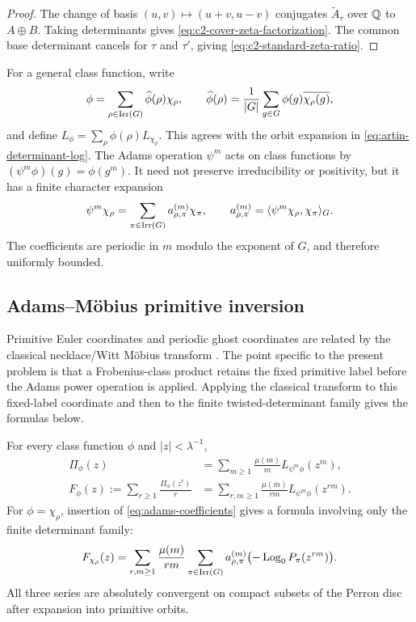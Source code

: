 \begin{proof}
The change of basis
\((u,v)\mapsto(u+v,u-v)\) conjugates \(\widetilde A_\tau\) over \(\mathbb{Q}\) to
\(A\oplus B\).  Taking determinants gives
\eqref{eq:c2-cover-zeta-factorization}.  The common base determinant cancels
for \(\tau\) and \(\tau'\), giving \eqref{eq:c2-standard-zeta-ratio}.
\end{proof}

For a general class function, write
\[
  \phi=\sum_{\rho\in\operatorname{Irr}(G)}
     \widehat\phi(\rho)\chi_\rho,
  \qquad
  \widehat\phi(\rho)
    =\frac1{|G|}\sum_{g\in G}\phi(g)\overline{\chi_\rho(g)},
\]
and define \(L_\phi=\sum_\rho\widehat\phi(\rho)L_{\chi_\rho}\).  This agrees
with the orbit expansion in \eqref{eq:artin-determinant-log}.  The Adams
operation \(\psi^m\) acts on class functions by
\((\psi^m\phi)(g)=\phi(g^m)\).  It need not preserve irreducibility or
positivity, but it has a finite character expansion
\begin{equation}\label{eq:adams-coefficients}
  \psi^m\chi_\rho=\sum_{\pi\in\operatorname{Irr}(G)}
      a_{\rho,\pi}^{(m)}\chi_\pi,
  \qquad
  a_{\rho,\pi}^{(m)}
     =\langle\psi^m\chi_\rho,\chi_\pi\rangle_G.
\end{equation}
The coefficients are periodic in \(m\) modulo the exponent of \(G\), and
therefore uniformly bounded.

\subsection{Adams--M\"obius primitive inversion}

Primitive Euler coordinates and periodic ghost coordinates are related by the
classical necklace/Witt M\"obius transform
\cite{MetropolisRota1983Necklaces}.  The point specific to the present problem
is that a Frobenius-class product retains the fixed primitive label before the
Adams power operation is applied.  Applying the classical transform to this
fixed-label coordinate and then to the finite twisted-determinant family gives
the formulas below.

\begin{theorem}
\label{thm:adams-mobius}
For every class function \(\phi\) and \(|z|<\lambda^{-1}\),
\begin{align}
  \Pi_\phi(z)
    &=\sum_{m\geq1}\frac{\mu(m)}{m}
       L_{\psi^m\phi}(z^m),
       \label{eq:primitive-adams-mobius}\\
  F_\phi(z):=\sum_{r\geq1}\frac{\Pi_\phi(z^r)}{r}
    &=\sum_{r,m\geq1}\frac{\mu(m)}{rm}
       L_{\psi^m\phi}(z^{rm}).
       \label{eq:fixed-adams-mobius}
\end{align}
For \(\phi=\chi_\rho\), insertion of \eqref{eq:adams-coefficients} gives a
formula involving only the finite determinant family:
\begin{equation}\label{eq:fixed-determinant-open-disc}
  F_{\chi_\rho}(z)=
  \sum_{r,m\geq1}\frac{\mu(m)}{rm}
    \sum_{\pi\in\operatorname{Irr}(G)}a_{\rho,\pi}^{(m)}
      \bigl(-\operatorname{Log}_0P_\pi(z^{rm})\bigr).
\end{equation}
All three series are absolutely convergent on compact subsets of the Perron
disc after expansion into primitive orbits.
\end{theorem}

